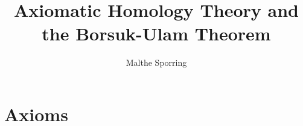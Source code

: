 \documentclass[11pt,a4paper]{article}
\title{Axiomatic Homology Theory and the Borsuk-Ulam Theorem}
\author{Malthe Sporring}
\numberwithin{thm}{section}
\begin{document}
\maketitle

\section{Axioms}




\end{document}
